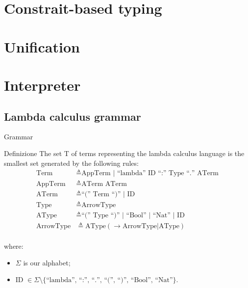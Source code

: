 \documentclass[8pt]{beamer}
\begin{document}
\section{Constrait-based typing}

\section{Unification}

\section{Interpreter}

\subsection{Lambda calculus grammar}

\begin{frame}{Grammar}
  \begin{block}{Definizione}
    The set T of terms representing the lambda calculus language is the
    smallest set generated by the following rules:
  \begin{displaymath}
    \begin{split}
      \text{Term} &\triangleq \text{AppTerm | ``lambda'' ID ``:'' Type ``.''
        ATerm}\\
      \text{AppTerm} &\triangleq \text{ATerm ATerm} \\
      \text{ATerm} &\triangleq \text{``('' Term ``)'' | ID}\\
      \text{Type} &\triangleq \text{ArrowType}\\
      \text{AType} &\triangleq \text{``('' Type ``)'' | ``Bool'' |
        ``Nat'' | ID}\\
      \text{ArrowType} &\triangleq \text{AType} (\rightarrow
      \text{ArrowType} | \text{AType})\\
    \end{split}
  \end{displaymath}
\end{block}
where:
\begin{itemize}
    \item $\Sigma$ is our alphabet;
    \item ID $\in \Sigma \setminus \{ \text{``lambda'', ``:'', ``.'',
  ``('', ``)'', ``Bool'', ``Nat''} \}$.
\end{itemize}

\end{frame}
\end{document}
